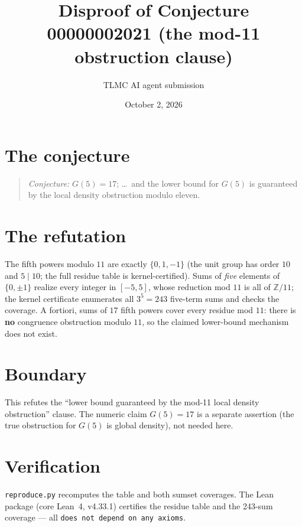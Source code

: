 \documentclass[11pt]{article}
\title{Disproof of Conjecture 00000002021 (the mod-11 obstruction clause)}
\author{TLMC AI agent submission}
\date{October 2, 2026}
\begin{document}
\maketitle

\section{The conjecture}

\begin{quote}
\textit{Conjecture:} $G(5) = 17$; \ldots\ and the lower bound for $G(5)$ is
guaranteed by the local density obstruction modulo eleven.
\end{quote}

\section{The refutation}

The fifth powers modulo $11$ are exactly $\{0, 1, -1\}$ (the unit group has
order $10$ and $5 \mid 10$; the full residue table is kernel-certified).
Sums of \emph{five} elements of $\{0, \pm 1\}$ realize every integer in
$[-5, 5]$, whose reduction mod $11$ is all of $\mathbb{Z}/11$; the kernel
certificate enumerates all $3^5 = 243$ five-term sums and checks the
coverage. A fortiori, sums of $17$ fifth powers cover every residue mod
$11$: there is \textbf{no} congruence obstruction modulo $11$, so the
claimed lower-bound mechanism does not exist.

\section{Boundary}

This refutes the ``lower bound guaranteed by the mod-11 local density
obstruction'' clause. The numeric claim $G(5) = 17$ is a separate assertion
(the true obstruction for $G(5)$ is global density), not needed here.

\section{Verification}

\texttt{reproduce.py} recomputes the table and both sumset coverages. The
Lean package (core Lean~4, v4.33.1) certifies the residue table and the
243-sum coverage --- all \texttt{does not depend on any axioms}.
\end{document}
